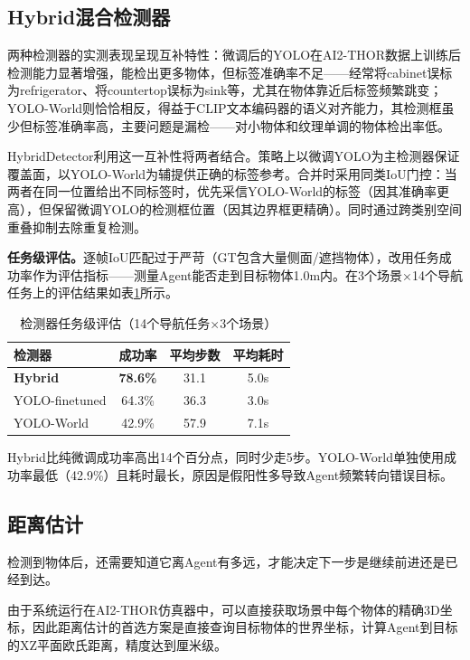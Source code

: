 \documentclass{SYSUReport}
\begin{document}
\clearpage

\subsection{Hybrid混合检测器}

两种检测器的实测表现呈现互补特性：微调后的YOLO在AI2-THOR数据上训练后检测能力显著增强，能检出更多物体，但标签准确率不足——经常将cabinet误标为refrigerator、将countertop误标为sink等，尤其在物体靠近后标签频繁跳变；YOLO-World则恰恰相反，得益于CLIP文本编码器的语义对齐能力，其检测框虽少但标签准确率高，主要问题是漏检——对小物体和纹理单调的物体检出率低。

HybridDetector利用这一互补性将两者结合。策略上以微调YOLO为主检测器保证覆盖面，以YOLO-World为辅提供正确的标签参考。合并时采用同类IoU门控：当两者在同一位置给出不同标签时，优先采信YOLO-World的标签（因其准确率更高），但保留微调YOLO的检测框位置（因其边界框更精确）。同时通过跨类别空间重叠抑制去除重复检测。


\textbf{任务级评估。}逐帧IoU匹配过于严苛（GT包含大量侧面/遮挡物体），改用任务成功率作为评估指标——测量Agent能否走到目标物体1.0m内。在3个场景×14个导航任务上的评估结果如表\ref{tab:detector_task_eval}所示。

\begin{table}[!ht]
  \centering
  \caption{检测器任务级评估（14个导航任务×3个场景）}
  \label{tab:detector_task_eval}
  \begin{tabular}{lccc}
    \toprule
    检测器 & 成功率 & 平均步数 & 平均耗时 \\
    \midrule
    \textbf{Hybrid} & \textbf{78.6\%} & 31.1 & 5.0s \\
    YOLO-finetuned & 64.3\% & 36.3 & 3.0s \\
    YOLO-World & 42.9\% & 57.9 & 7.1s \\
    \bottomrule
  \end{tabular}
\end{table}

Hybrid比纯微调成功率高出14个百分点，同时少走5步。YOLO-World单独使用成功率最低（42.9\%）且耗时最长，原因是假阳性多导致Agent频繁转向错误目标。

\subsection{距离估计}

检测到物体后，还需要知道它离Agent有多远，才能决定下一步是继续前进还是已经到达。

由于系统运行在AI2-THOR仿真器中，可以直接获取场景中每个物体的精确3D坐标，因此距离估计的首选方案是直接查询目标物体的世界坐标，计算Agent到目标的XZ平面欧氏距离，精度达到厘米级。
\end{document}
